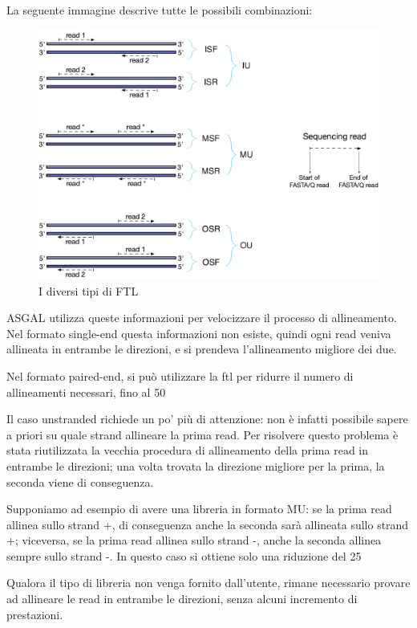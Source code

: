La seguente immagine descrive tutte le possibili combinazioni:
\begin{figure}[h]
	\centering
	\includegraphics[width=\linewidth]{images/fragmentlibrarytypes.png}
  \caption{I diversi tipi di FTL}
  \label{fig:FragmentLibraryTypes}
\end{figure}

\newpage

ASGAL utilizza queste informazioni per velocizzare il processo di allineamento. Nel formato single-end questa informazioni non esiste, quindi ogni read veniva allineata in entrambe le direzioni, e si prendeva l'allineamento migliore dei due. 

Nel formato paired-end, si può utilizzare la ftl per ridurre il numero di allineamenti necessari, fino al 50%

Il caso unstranded richiede un po' più di attenzione: non è infatti possibile sapere a priori su quale strand allineare la prima read. Per risolvere questo problema è stata riutilizzata la vecchia procedura di allineamento della prima read in entrambe le direzioni; una volta trovata la direzione migliore per la prima, la seconda viene di conseguenza. 

Supponiamo ad esempio di avere una libreria in formato MU: se la prima read allinea sullo strand +, di conseguenza anche la seconda sarà allineata sullo strand +; viceversa, se la prima read allinea sullo strand -, anche la seconda allinea sempre sullo strand -. In questo caso si ottiene solo una riduzione del 25%

Qualora il tipo di libreria non venga fornito dall'utente, rimane necessario provare ad allineare le read in entrambe le direzioni, senza alcuni incremento di prestazioni.


